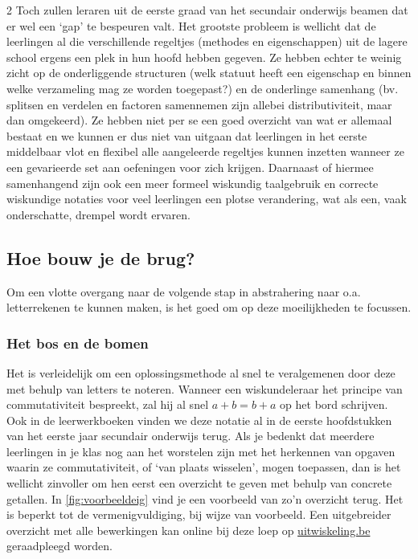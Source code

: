 \begin{multicols}{2}
Toch zullen leraren uit de eerste graad van het secundair onderwijs beamen dat er wel een `gap' te bespeuren valt.
Het grootste probleem is wellicht dat de leerlingen al die verschillende regeltjes (methodes en eigenschappen) uit de lagere school ergens een plek in hun hoofd hebben gegeven.
Ze hebben echter te weinig zicht op de onderliggende structuren (welk statuut heeft een eigenschap en binnen welke verzameling mag ze worden toegepast?) en de onderlinge samenhang (bv. splitsen en verdelen en factoren samennemen zijn allebei distributiviteit, maar dan omgekeerd).
Ze hebben niet per se een goed overzicht van wat er allemaal bestaat en we kunnen er dus niet van uitgaan dat leerlingen in het eerste middelbaar vlot en flexibel alle aangeleerde regeltjes kunnen inzetten wanneer ze een gevarieerde set aan oefeningen voor zich krijgen.
Daarnaast of hiermee samenhangend zijn ook een meer formeel wiskundig taalgebruik en correcte wiskundige notaties voor veel leerlingen een plotse verandering, wat als een, vaak onderschatte, drempel wordt ervaren.

\subsection{Hoe bouw je de brug?}
Om een vlotte overgang naar de volgende stap in abstrahering naar o.a. letterrekenen te kunnen maken, is het goed om op deze moeilijkheden te focussen.

\subsubsection*{Het bos en de bomen}
Het is verleidelijk om een oplossingsmethode al snel te veralgemenen door deze met behulp van letters te noteren.
Wanneer een wiskundeleraar het principe van commutativiteit bespreekt, zal hij al snel \(a + b = b + a\) op het bord schrijven.
Ook in de leerwerkboeken vinden we deze notatie al in de eerste hoofdstukken van het eerste jaar secundair onderwijs terug.
Als je bedenkt dat meerdere leerlingen in je klas nog aan het worstelen zijn met het herkennen van opgaven waarin ze commutativiteit, of `van plaats wisselen', mogen toepassen, dan is het wellicht zinvoller om hen eerst een overzicht te geven met behulp van concrete getallen.
In \autoref{fig:voorbeeldeig} vind je een voorbeeld van zo'n overzicht terug.
Het is beperkt tot de vermenigvuldiging, bij wijze van voorbeeld.
Een uitgebreider overzicht met alle bewerkingen kan online bij deze loep op \url{uitwiskeling.be} geraadpleegd worden.

\end{multicols}
